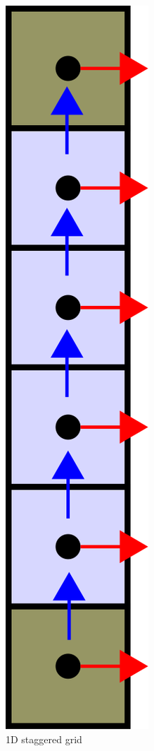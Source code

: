 \begin{figure}[H]
    \includegraphics[height=0.5\textheight]{../../media/1d-NS}
    \caption{1D staggered grid}
    \label{fig:1d-grid}
\end{figure}
